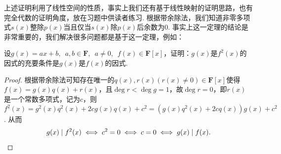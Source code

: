 上述证明利用了线性空间的性质，事实上我们还有基于线性映射的证明思路，也有完全代数的证明角度，放在习题中供读者练习. 根据带余除法，我们知道非零多项式$s(x)$整除$p(x)$当且仅当$s(x)$除$p(x)$后余数为$0$. 事实上这一定理的结论是非常重要的，我们解决很多问题都是基于这一定理，例如：
\begin{example}{}{}
    设$g(x)=ax+b,\enspace a,b\in\mathbf{F},\enspace a\neq 0,\enspace
        f(x)\in \mathbf{F}[x]$，证明：$g(x)$是$f^2(x)$的因式的充要条件是$g(x)$是$f(x)$的因式.
\end{example}
\begin{proof}
    根据带余除法可知存在唯一的$q(x),r(x)(r(x)\neq 0)\in\mathbf{F}[x]$使得$f(x)=g(x)q(x)+r(x)$，且$\deg r<\deg g=1$，故$\deg r=0$，即$r(x)$是一个常数多项式，记为$c$，则$f^2(x)=g^2(x)q^2(x)+2cg(x)q(x)+c^2=(g(x)q^2(x)+2cq(x))g(x)+c^2$. 从而\[g(x) \mid f^2(x) \iff c^2=0 \iff c=0 \iff g(x) \mid f(x). \qedhere\]
\end{proof}

